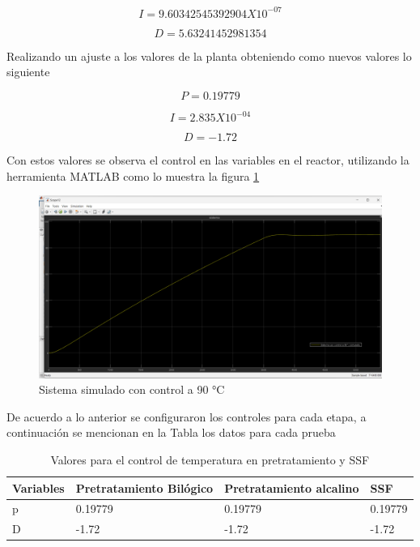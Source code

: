 \documentclass[12pt]{article}
\begin{document}
	\begin{equation}
		I=9.60342545392904 X 10^{-07}
	\end{equation}
	
	\begin{equation}
		D=5.63241452981354
	\end{equation}
	
	Realizando un ajuste a los valores de la planta obteniendo como nuevos valores lo siguiente
	
	\begin{equation}
		P=0.19779
	\end{equation}
	
	\begin{equation}
		I=2.835 X 10^{-04}
	\end{equation}
	
	\begin{equation}
		D=-1.72
	\end{equation}
	
	Con estos valores se observa el control en las variables en el reactor, utilizando la herramienta MATLAB como lo muestra la figura \ref{sistema simulado}
	
	\begin{figure}[H]
		\centering
		\includegraphics[width=0.8\linewidth]{imagenes/sistema_controlado}
		\caption{Sistema simulado con control a 90 °C}
		\label{sistema simulado}
	\end{figure}
	
	
	De acuerdo a lo anterior se configuraron los controles para cada etapa, a continuación se mencionan en la Tabla los datos para cada prueba
	
	
	\begin{table}[!ht]
		\centering
		\caption{Valores para el control de temperatura en pretratamiento y SSF}
		\begin{tabular}{|l|l|l|l|}
			\hline
			Variables & Pretratamiento Bilógico & Pretratamiento alcalino & SSF \\ \hline
			p & 0.19779 & 0.19779 & 0.19779 \\ \hline
		
			D & -1.72 & -1.72 & -1.72 \\ \hline
\end{tabular}
\label{tabla_control}
\end{table}
	
	
	
	
	
	
\end{document}
